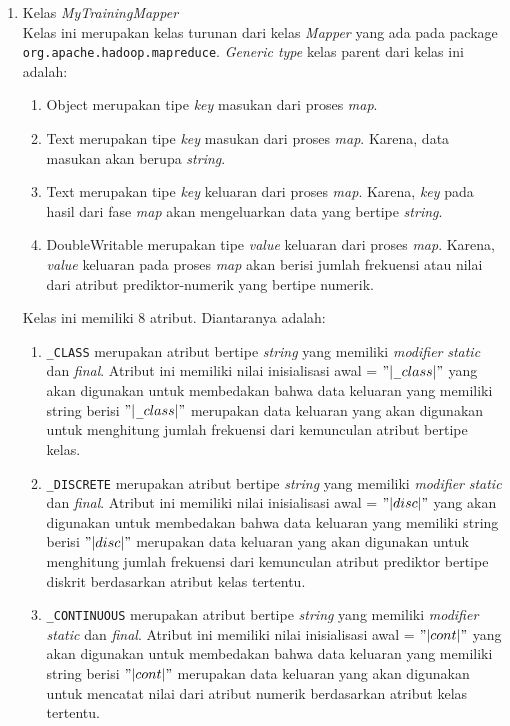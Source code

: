 \begin{enumerate}
	\item{Kelas \textit{MyTrainingMapper}}\\
	Kelas ini merupakan kelas turunan dari kelas \textit{Mapper} yang ada pada package \verb|org.apache.hadoop.mapreduce|. \textit{Generic type} kelas parent dari kelas ini adalah:
	\begin{enumerate}
		\item{Object} merupakan tipe \textit{key} masukan dari proses \textit{map}.
		\item{Text} merupakan tipe \textit{key} masukan dari proses \textit{map}. Karena, data masukan akan berupa \textit{string}.
		\item{Text} merupakan tipe \textit{key} keluaran dari proses \textit{map}. Karena, \textit{key} pada hasil dari fase \textit{map} akan mengeluarkan data yang bertipe \textit{string}.
		\item{DoubleWritable} merupakan tipe \textit{value} keluaran dari proses \textit{map}. Karena, \textit{value} keluaran pada proses \textit{map} akan berisi jumlah frekuensi atau nilai dari atribut prediktor-numerik yang bertipe numerik.
	\end{enumerate}
	Kelas ini memiliki 8 atribut. Diantaranya adalah:
	\begin{enumerate}
		\item \verb|_CLASS| merupakan atribut bertipe \textit{string} yang memiliki \textit{modifier} \textit{static} dan \textit{final}. Atribut ini memiliki nilai inisialisasi awal = $"|$\verb|_|$class|"$ yang akan digunakan untuk membedakan bahwa data keluaran yang memiliki string berisi $"|$\verb|_|$class|"$ merupakan data keluaran yang akan digunakan untuk menghitung jumlah frekuensi dari kemunculan atribut bertipe kelas.
		\item \verb|_DISCRETE| merupakan atribut bertipe \textit{string} yang memiliki \textit{modifier} \textit{static} dan \textit{final}. Atribut ini memiliki nilai inisialisasi awal = $"|disc|"$ yang akan digunakan untuk membedakan bahwa data keluaran yang memiliki string berisi $"|disc|"$ merupakan data keluaran yang akan digunakan untuk menghitung jumlah frekuensi dari kemunculan atribut prediktor bertipe diskrit berdasarkan atribut kelas tertentu.
		\item \verb|_CONTINUOUS| merupakan atribut bertipe \textit{string} yang memiliki \textit{modifier} \textit{static} dan \textit{final}. Atribut ini memiliki nilai inisialisasi awal = $"|cont|"$ yang akan digunakan untuk membedakan bahwa data keluaran yang memiliki string berisi $"|cont|"$ merupakan data keluaran yang akan digunakan untuk mencatat nilai dari atribut numerik berdasarkan atribut kelas tertentu.

\end{enumerate}
\end{enumerate}
